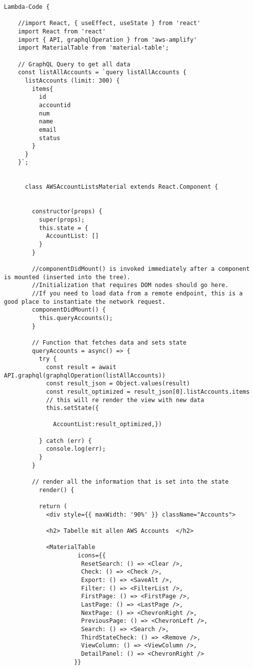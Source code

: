 

\begin{lstlisting}[caption={React AccountsListMaterial.js},
label=lst:React AccountList,basicstyle=\ttfamily\small ] Lambda-Code {

    //import React, { useEffect, useState } from 'react'
    import React from 'react'
    import { API, graphqlOperation } from 'aws-amplify'
    import MaterialTable from 'material-table';

    // GraphQL Query to get all data
    const listAllAccounts = `query listAllAccounts {
      listAccounts (limit: 300) {
        items{
          id
          accountid
          num
          name
          email
          status
        }
      }
    }`;


      class AWSAccountListsMaterial extends React.Component {


        constructor(props) {
          super(props);
          this.state = {
            AccountList: []
          }
        }

        //componentDidMount() is invoked immediately after a component is mounted (inserted into the tree).
        //Initialization that requires DOM nodes should go here.
        //If you need to load data from a remote endpoint, this is a good place to instantiate the network request.
        componentDidMount() {
          this.queryAccounts();
        }

        // Function that fetches data and sets state
        queryAccounts = async() => {
          try {
            const result = await API.graphql(graphqlOperation(listAllAccounts))
            const result_json = Object.values(result)
            const result_optimized = result_json[0].listAccounts.items
            // this will re render the view with new data
            this.setState({

              AccountList:result_optimized,})

          } catch (err) {
            console.log(err);
          }
        }

        // render all the information that is set into the state
          render() {

          return (
            <div style={{ maxWidth: '90%' }} className="Accounts">

            <h2> Tabelle mit allen AWS Accounts  </h2>

            <MaterialTable
                     icons={{
                      ResetSearch: () => <Clear />,
                      Check: () => <Check />,
                      Export: () => <SaveAlt />,
                      Filter: () => <FilterList />,
                      FirstPage: () => <FirstPage />,
                      LastPage: () => <LastPage />,
                      NextPage: () => <ChevronRight />,
                      PreviousPage: () => <ChevronLeft />,
                      Search: () => <Search />,
                      ThirdStateCheck: () => <Remove />,
                      ViewColumn: () => <ViewColumn />,
                      DetailPanel: () => <ChevronRight />
                    }}


\end{lstlisting}
